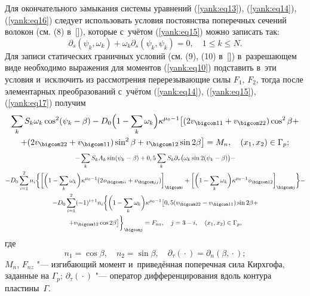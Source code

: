 Для окончательного замыкания системы уравнений (\ref{yank:eq13}), (\ref{yank:eq14}), (\ref{yank:eq16}) следует использовать условия постоянства поперечных сечений волокон (см. (8) в~[]), которые с~учётом (\ref{yank:eq15}) можно записать так:
\begin{equation}
\label{yank:eq17}
\partial_s (\psi_k ,\omega_k )+\omega_k \partial_s (\psi_k ,\psi_k )=0, \quad 1\leq k \leq N.
\end{equation}
Для записи статических граничных условий (см. (9), (10) в~[]) в~разрешающем виде необходимо выражения для моментов (\ref{yank:eq10}) подставить в~эти условия и~исключить из рассмотрения перерезывающие силы $F_1 $, $F_2 $, тогда после элементарных преобразований с~учётом (\ref{yank:eq14}), (\ref{yank:eq15}), (\ref{yank:eq17}) получим
\begin{multline} \label{yank:eq18}
\sum\limits_k S_k \omega_k \cos^2 ({\psi_k -\beta})-D_0 \Bigl(1-\sum\limits_k \omega_k \Bigr)\kappa^{\mu_0  -1}
\bigl[( 2v_{\bigcom 11} +v_{\bigcom 22}) \cos^2 \beta + \\
+(2v_{\bigcom 22} +v_{\bigcom 11}  )\sin^2 \beta +v_{\bigcom 12} \sin2\beta \bigr]=M_{n}, \quad ({x_1 , x_2  } )\in \Gamma_{p} ; 
\end{multline}
\begin{multline} 
\label{yank:eq19}
-\sum\limits_k S_k A_k \sin(\psi_k -\beta)+
0,5\sum\limits_k  S_k \partial_\tau \bigl(\omega_k \sin2(\psi_k -\beta)\bigr)- \\
-D_0  \sum\limits_{i=1}^2 n_i 
\biggl\{\biggl[\biggl( 1-\sum\limits_k \omega_k \biggl)\kappa^{\mu_0 -1}(2v_{\bigcom ii}+v_{\bigcom jj})\biggr]_{\bigcom i}+ 
\biggl[\biggl(1-\sum\limits_k \omega_k \biggr)
\kappa^{\mu_0  -1}{v_{\bigcom 12} } \biggr]_{\bigcom j} \biggr\}- \\
-
D_0  \sum\limits_{i=1}^2 (-1)^{i+1}n_{i}\biggl\{ \biggl(1-\sum\limits_k \omega_k \biggr)\kappa^{\mu_0 -1}\bigl[0,5(v_{\bigcom 22}-v_{\bigcom 11})\sin2\beta + \\
+v_{\bigcom 12}\cos2\beta\bigr]\biggr\}_{\bigcom j}=F_{nz}, \quad j=3-i, \quad (x_1 , x_2 )\in \Gamma_{p},
\end{multline}
где
\begin{equation}
\label{yank:eq20}
n_1  =\cos \beta, \quad n_2  =\sin \beta, \quad \partial_\tau ({} \cdot {})=\partial_{n}( {\beta,{} \cdot {}});
\end{equation}
$M_{n}$, $F_{nz}$ "--- изгибающий момент и~приведённая поперечная сила Кирхгофа, заданные на $\Gamma_{p}$; $\partial_\tau ({} \cdot {})$ "--- оператор дифференцирования вдоль контура плас\-тины~$\Gamma$.

